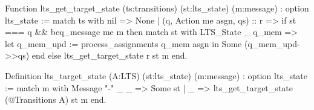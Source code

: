 Function lts_get_target_state (ts:transitions) 
                          (st:lts_state) (m:message) : option lts_state :=
  match ts with
    nil                           => None
  | (q, Action me asgn, qs) :: r => 
                                    if st === q && beq_message me m then 
                                      match st with
                                        LTS_State _ q_mem =>
                                          let q_mem_upd := process_assignments q_mem asgn in  
                                          Some (q_mem_upd->>qs) 
                                      end
                                    else 
                                      lts_get_target_state r st m 
  end.

Definition lts_target_state (A:LTS) (st:lts_state) (m:message) : option lts_state :=
  match m with
    Message "-" _ _ => Some st
  | _ => lts_get_target_state (@Transitions A) st m
  end.
